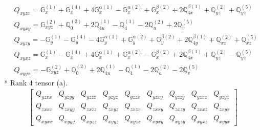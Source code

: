 \documentclass[fleqn,8pt,landscape]{jsarticle}
\begin{document}
\begin{align*}
& Q_{xyzx} = \mathbb{G}_{x}^{(1)} + \mathbb{G}_{x}^{(4)} + 4 \mathbb{G}_{x}^{\alpha(1)} - \mathbb{G}_{x}^{\alpha(2)} + \mathbb{G}_{x}^{\beta(2)} + 2 \mathbb{Q}_{4x}^{\beta(1)} + \mathbb{Q}_{yz}^{(2)} + \mathbb{Q}_{yz}^{(5)} \\
& Q_{xyxy} = \mathbb{G}_{xyz}^{(2)} + \mathbb{Q}_{0}^{(2)} + 2 \mathbb{Q}_{4u}^{(1)} - \mathbb{Q}_{4}^{(1)} - 2 \mathbb{Q}_{u}^{(2)} + 2 \mathbb{Q}_{v}^{(5)} \\
& Q_{xyzy} = - \mathbb{G}_{y}^{(1)} - \mathbb{G}_{y}^{(4)} - 4 \mathbb{G}_{y}^{\alpha(1)} + \mathbb{G}_{y}^{\alpha(2)} + \mathbb{G}_{y}^{\beta(2)} + 2 \mathbb{Q}_{4y}^{\beta(1)} + \mathbb{Q}_{xz}^{(2)} + \mathbb{Q}_{xz}^{(5)} \\
& Q_{xyxz} = \mathbb{G}_{x}^{(1)} - \mathbb{G}_{x}^{(4)} + 4 \mathbb{G}_{x}^{\alpha(1)} + \mathbb{G}_{x}^{\alpha(2)} - \mathbb{G}_{x}^{\beta(2)} + 2 \mathbb{Q}_{4x}^{\beta(1)} + \mathbb{Q}_{yz}^{(2)} - \mathbb{Q}_{yz}^{(5)} \\
& Q_{xyyx} = - \mathbb{G}_{xyz}^{(2)} + \mathbb{Q}_{0}^{(2)} + 2 \mathbb{Q}_{4u}^{(1)} - \mathbb{Q}_{4}^{(1)} - 2 \mathbb{Q}_{u}^{(2)} - 2 \mathbb{Q}_{v}^{(5)}
\end{align*}
* Rank 4 tensor (a).
\begin{align*}
\begin{bmatrix} Q_{yzxx} & Q_{yzyy} & Q_{yzzz} & Q_{yzyz} & Q_{yzzx} & Q_{yzxy} & Q_{yzzy} & Q_{yzxz} & Q_{yzyx} \\ Q_{zxxx} & Q_{zxyy} & Q_{zxzz} & Q_{zxyz} & Q_{zxzx} & Q_{zxxy} & Q_{zxzy} & Q_{zxxz} & Q_{zxyx} \\ Q_{xyxx} & Q_{xyyy} & Q_{xyzz} & Q_{xyyz} & Q_{xyzx} & Q_{xyxy} & Q_{xyzy} & Q_{xyxz} & Q_{xyyx} \end{bmatrix}
\end{align*}
\end{document}
